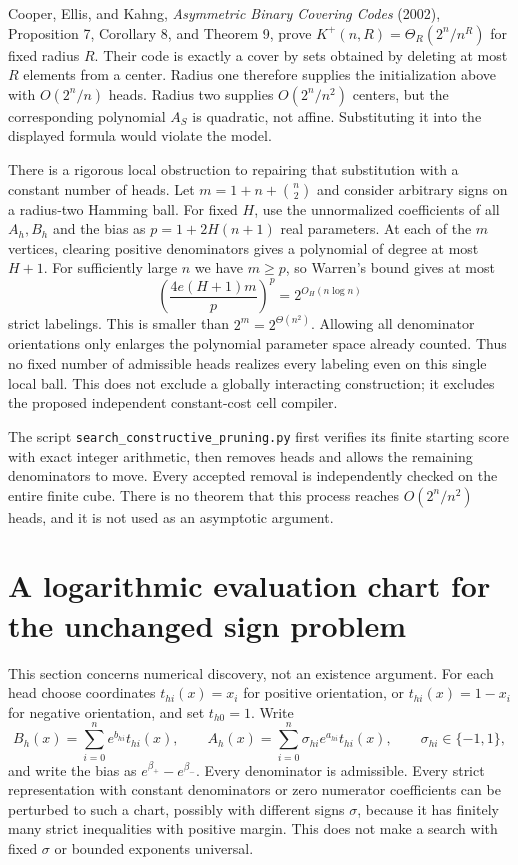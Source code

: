 \documentclass[11pt]{article}
\begin{document}
Cooper, Ellis, and Kahng, \emph{Asymmetric Binary Covering Codes}
(2002), Proposition 7, Corollary 8, and Theorem 9, prove
$K^+(n,R)=\Theta_R(2^n/n^R)$ for fixed radius $R$.
Their code is exactly a cover by sets obtained by deleting at most
$R$ elements from a center. Radius one therefore supplies the
initialization above with $O(2^n/n)$ heads. Radius two supplies
$O(2^n/n^2)$ centers, but the corresponding polynomial $A_S$ is
quadratic, not affine. Substituting it into the displayed formula
would violate the model.

There is a rigorous local obstruction to repairing that substitution
with a constant number of heads. Let
$m=1+n+\binom n2$ and consider arbitrary signs on a radius-two
Hamming ball. For fixed $H$, use the unnormalized coefficients of
all $A_h,B_h$ and the bias as
$p=1+2H(n+1)$ real parameters. At each of the $m$ vertices,
clearing positive denominators gives a polynomial of degree at most
$H+1$. For sufficiently large $n$ we have $m\geq p$, so Warren's
bound gives at most
\[
 \left(\frac{4e(H+1)m}{p}\right)^p
 =2^{O_H(n\log n)}
\]
strict labelings. This is smaller than $2^m=2^{\Theta(n^2)}$.
Allowing all denominator orientations only enlarges the polynomial
parameter space already counted. Thus no fixed number of admissible
heads realizes every labeling even on this single local ball.
This does not exclude a globally interacting construction; it excludes
the proposed independent constant-cost cell compiler.

The script \texttt{search\_constructive\_pruning.py} first verifies
its finite starting score with exact integer arithmetic, then removes
heads and allows the remaining denominators to move. Every accepted
removal is independently checked on the entire finite cube. There is
no theorem that this process reaches $O(2^n/n^2)$ heads, and it is not
used as an asymptotic argument.

\section{A logarithmic evaluation chart for the unchanged sign problem}

This section concerns numerical discovery, not an existence argument.
For each head choose coordinates $t_{hi}(x)=x_i$ for positive
orientation, or $t_{hi}(x)=1-x_i$ for negative orientation, and set
$t_{h0}=1$. Write
\[
 B_h(x)=\sum_{i=0}^n e^{b_{hi}}t_{hi}(x),\qquad
 A_h(x)=\sum_{i=0}^n\sigma_{hi}e^{a_{hi}}t_{hi}(x),
 \qquad \sigma_{hi}\in\{-1,1\},
\]
and write the bias as $e^{\beta_+}-e^{\beta_-}$. Every denominator
is admissible. Every strict representation with constant denominators
or zero numerator coefficients can be perturbed to such a chart,
possibly with different signs $\sigma$, because it has finitely many
strict inequalities with positive margin. This does not make a search
with fixed $\sigma$ or bounded exponents universal.
\end{document}

